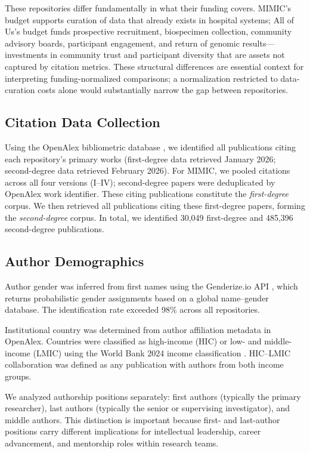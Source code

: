 \documentclass[11pt]{article}
\begin{document}
These repositories differ fundamentally in what their funding covers.
MIMIC's budget supports curation of data that already exists in hospital systems; All of Us's budget funds prospective recruitment, biospecimen collection, community advisory boards, participant engagement, and return of genomic results---investments in community trust and participant diversity that are assets not captured by citation metrics.
These structural differences are essential context for interpreting funding-normalized comparisons; a normalization restricted to data-curation costs alone would substantially narrow the gap between repositories.

\subsection{Citation Data Collection}
\label{sec:citation-collection}

Using the OpenAlex bibliometric database \cite{priem2022openalex}, we identified all publications citing each repository's primary works (first-degree data retrieved January 2026; second-degree data retrieved February 2026).
For MIMIC, we pooled citations across all four versions (I--IV); second-degree papers were deduplicated by OpenAlex work identifier.
These citing publications constitute the \textit{first-degree} corpus.
We then retrieved all publications citing these first-degree papers, forming the \textit{second-degree} corpus.
In total, we identified 30,049 first-degree and 485,396 second-degree publications.

\subsection{Author Demographics}
\label{sec:demographics}

Author gender was inferred from first names using the Genderize.io API \cite{genderize}, which returns probabilistic gender assignments based on a global name--gender database.
The identification rate exceeded 98\% across all repositories.

Institutional country was determined from author affiliation metadata in OpenAlex.
Countries were classified as high-income (HIC) or low- and middle-income (LMIC) using the World Bank 2024 income classification \cite{worldbank2024}.
HIC--LMIC collaboration was defined as any publication with authors from both income groups.

We analyzed authorship positions separately: first authors (typically the primary researcher), last authors (typically the senior or supervising investigator), and middle authors.
This distinction is important because first- and last-author positions carry different implications for intellectual leadership, career advancement, and mentorship roles within research teams.
\end{document}
